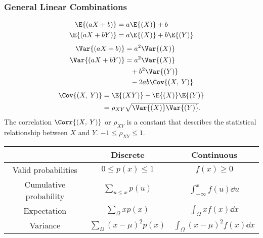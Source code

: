 \documentclass{article}
\begin{document}
\begin{minipage}{126.1962963mm}
\begin{multicols}{2}
        \subsubsection*{General Linear Combinations}
        \begin{align*}
            \E{\left( aX+b \right)}  & = a\E{\left( X \right)} + b                     \\
            \E{\left( aX+bY \right)} & = a\E{\left( X \right)} + b\E{\left( Y \right)}
        \end{align*}
        \begin{align*}
            \Var{\left( aX+b \right)}  & = a^2\Var{\left( X \right)}                  \\
            \Var{\left( aX+bY \right)} & = a^2\Var{\left( X \right)}                  \\
                                       & \phantom{=} + b^2\Var{\left( Y \right)}      \\
                                       & \phantom{=} - 2ab\Cov{\left( X,\: Y \right)}
        \end{align*}
        \begin{align*}
            \Cov{\left( X,\: Y \right)} & = \E{\left( XY \right)} - \E{\left( X \right)}\E{\left( Y \right)} \\
                                        & = \rho_{XY} \sqrt{\Var{\left( X \right)}\Var{\left( Y \right)}}.
        \end{align*}
        The correlation $\Corr{\left( X,\: Y \right)}$ or $\rho_{XY}$ is a constant that describes the statistical relationship
        between $X$ and $Y$. $-1 \leq \rho_{XY} \leq 1$.
    \end{multicols}
    \begin{table}[H]
        \centering
        \begin{tabular}{c | c | c}
            \toprule
                                   & \textbf{Discrete}                            & \textbf{Continuous}                                \\
            \midrule
            Valid probabilities    & $0 \leq p(x) \leq 1$                         & $f(x) \geq 0$                                      \\
            Cumulative probability & $\sum_{u \leq x} p(u)$                       & $\int_{-\infty}^{x} f(u) \dd{u}$                   \\
            Expectation            & $\sum_{\Omega} xp(x)$                        & $\int_{\Omega} xf(x)\dd{x}$                        \\
            Variance               & $\sum_{\Omega} \left( x - \mu \right)^2p(x)$ & $\int_{\Omega} \left( x - \mu \right)^2f(x)\dd{x}$ \\
            \bottomrule
        \end{tabular}
    \end{table}
\end{minipage}\hfill%
\end{document}
